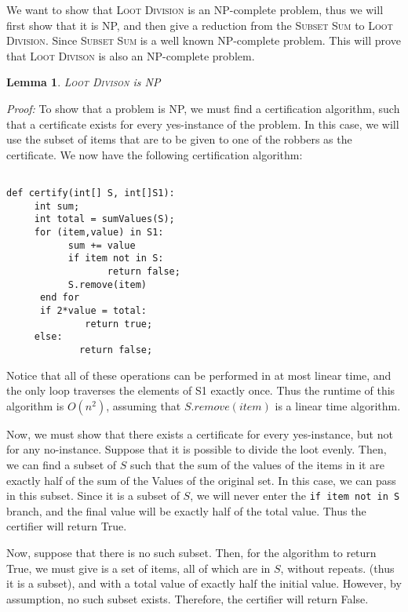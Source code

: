 \documentclass{article}
\newtheorem{lemma}[theorem]{Lemma}
\begin{document}
We want to show that \textsc{Loot Division} is an NP-complete problem, thus we will first show that it is NP, and then give a reduction from the \textsc{Subset Sum} to \textsc{Loot Division}.  Since \textsc{Subset Sum} is a well known NP-complete problem.  This will prove that \textsc{Loot Divison} is also an NP-complete problem.

\begin{lemma}
\textsc{Loot Divison} is NP
\end{lemma}

\textit{Proof:} To show that a problem is NP, we must find a certification algorithm, such that a certificate exists for every yes-instance of the problem.  In this case, we will use the subset of items that are to be given to one of the robbers as the certificate.  We now have the following certification algorithm:

\begin{verbatim}

def certify(int[] S, int[]S1):
     int sum;
     int total = sumValues(S);
     for (item,value) in S1:
           sum += value
           if item not in S:
                  return false;
           S.remove(item)
      end for
      if 2*value = total:
              return true;
     else:
             return false;

\end{verbatim}

Notice that all of these operations can be performed in at most linear time, and the only loop traverses the elements of S1 exactly once.  Thus the runtime of this algorithm is $O(n^2)$, assuming that $S.remove(item)$ is a linear time algorithm.

Now, we must show that there exists a certificate for every yes-instance, but not for any no-instance.  Suppose that it is possible to divide the loot evenly.  Then, we can find a subset of $S$ such that the sum of the values of the items in it are exactly half of the sum of the Values of the original set.  In this case, we can pass in this subset.  Since it is a subset of $S$, we will never enter the \texttt{if item not in S} branch, and the final value will be exactly half of the total value.  Thus the certifier will return True.

Now, suppose that there is no such subset.  Then, for the algorithm to return True, we must give is a set of items, all of which are in $S$, without repeats.  (thus it is a subset), and with a total value of exactly half the initial value.  However, by assumption, no such subset exists.  Therefore, the certifier will return False.
\end{document}
